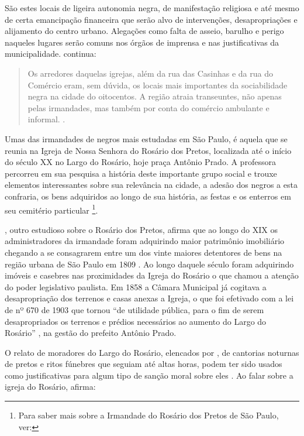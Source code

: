 \begin{refsection}
    São estes locais de ligeira autonomia negra, de manifestação religiosa e até mesmo de certa emancipação financeira que serão alvo de intervenções, desapropriações e alijamento do centro urbano. Alegações como falta de asseio, barulho e perigo naqueles lugares serão comuns nos órgãos de imprensa e nas justificativas da municipalidade. \textcite{Bertin2010Sociabilidade} continua:  
    
    \begin{quotation}
        Os arredores daquelas igrejas, além da rua das Casinhas e da rua do Comércio eram, sem dúvida, os locais mais importantes da sociabilidade negra na cidade do oitocentos. A região atraia transeuntes, não apenas pelas irmandades, mas também por conta do comércio ambulante e informal. \cite[p.~129]{Bertin2010Sociabilidade}.
    \end{quotation}


    Umas das irmandades de negros mais estudadas em São Paulo, é aquela que se reunia na Igreja de Nossa Senhora do Rosário dos Pretos, localizada até o início do século XX no Largo do Rosário, hoje praça Antônio Prado. A professora \textcite{Quintao2002Irmandades} percorreu em sua pesquisa a história deste importante grupo social e trouxe elementos interessantes sobre sua relevância  na cidade, a adesão dos negros a esta confraria, os bens adquiridos ao longo de sua história, as festas e os enterros em seu cemitério particular \footnote{Para saber mais sobre a Irmandade do Rosário dos Pretos de São Paulo, ver: }.
    
    \textcite{Santos2020Igrejas}, outro estudioso sobre o Rosário dos Pretos, afirma que ao longo do XIX os administradores da irmandade foram adquirindo maior patrimônio imobiliário chegando a se consagrarem entre um dos vinte maiores detentores de bens na região urbana de São Paulo em 1809 \cite[p.~180]{Santos2020Igrejas}. Ao longo daquele século foram adquirindo imóveis e casebres nas proximidades da Igreja do Rosário o que chamou a atenção do poder legislativo paulista. Em 1858 a Câmara Municipal já cogitava a desapropriação dos terrenos e casas anexas a Igreja, o que foi efetivado com a lei de nº 670 de 1903 que tornou ``de utilidade pública, para o fim de serem desapropriados os terrenos e prédios necessários ao aumento do Largo do Rosário'' \cite[p.~183]{Arroyo1966Igrejas}, na gestão do prefeito Antônio Prado.  
    
    O relato de moradores do Largo do Rosário, elencados por \textcite{Arroyo1966Igrejas}, de cantorias noturnas de pretos e ritos fúnebres que seguiam até altas horas, podem ter sido usados como justificativas para algum tipo de sanção moral sobre eles \cite[p.~181--182]{Arroyo1966Igrejas}. Ao falar sobre a igreja do Rosário, \textcite{Santos2020Igrejas} afirma:


\end{refsection}
